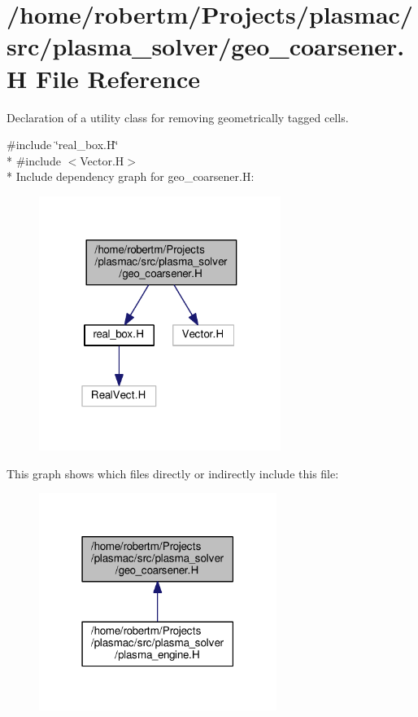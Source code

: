 \hypertarget{geo__coarsener_8H}{}\section{/home/robertm/\+Projects/plasmac/src/plasma\+\_\+solver/geo\+\_\+coarsener.H File Reference}
\label{geo__coarsener_8H}


Declaration of a utility class for removing geometrically tagged cells.  


{\ttfamily \#include \char`\"{}real\+\_\+box.\+H\char`\"{}}\\*
{\ttfamily \#include $<$Vector.\+H$>$}\\*
Include dependency graph for geo\+\_\+coarsener.\+H\+:\nopagebreak
\begin{figure}[H]
\begin{center}
\leavevmode
\includegraphics[width=223pt]{geo__coarsener_8H__incl}
\end{center}
\end{figure}
This graph shows which files directly or indirectly include this file\+:\nopagebreak
\begin{figure}[H]
\begin{center}
\leavevmode
\includegraphics[width=219pt]{geo__coarsener_8H__dep__incl}
\end{center}
\end{figure}
